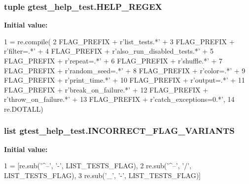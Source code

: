 \subsubsection[{H\+E\+L\+P\+\_\+\+R\+E\+G\+E\+X}]{\setlength{\rightskip}{0pt plus 5cm}tuple gtest\+\_\+help\+\_\+test.\+H\+E\+L\+P\+\_\+\+R\+E\+G\+E\+X}\label{namespacegtest__help__test_a0cc445bb25250e09cfa21c64a00e209e}
{\bfseries Initial value\+:}
\begin{DoxyCode}
1 = re.compile(
2     FLAG\_PREFIX + \textcolor{stringliteral}{r'list\_tests.*'} +
3     FLAG\_PREFIX + \textcolor{stringliteral}{r'filter=.*'} +
4     FLAG\_PREFIX + \textcolor{stringliteral}{r'also\_run\_disabled\_tests.*'} +
5     FLAG\_PREFIX + \textcolor{stringliteral}{r'repeat=.*'} +
6     FLAG\_PREFIX + \textcolor{stringliteral}{r'shuffle.*'} +
7     FLAG\_PREFIX + \textcolor{stringliteral}{r'random\_seed=.*'} +
8     FLAG\_PREFIX + \textcolor{stringliteral}{r'color=.*'} +
9     FLAG\_PREFIX + \textcolor{stringliteral}{r'print\_time.*'} +
10     FLAG\_PREFIX + \textcolor{stringliteral}{r'output=.*'} +
11     FLAG\_PREFIX + \textcolor{stringliteral}{r'break\_on\_failure.*'} +
12     FLAG\_PREFIX + \textcolor{stringliteral}{r'throw\_on\_failure.*'} +
13     FLAG\_PREFIX + \textcolor{stringliteral}{r'catch\_exceptions=0.*'},
14     re.DOTALL)
\end{DoxyCode}
\hypertarget{namespacegtest__help__test_a6f677b9f975f09db7604a5ee9c4821a3}{}
\subsubsection[{I\+N\+C\+O\+R\+R\+E\+C\+T\+\_\+\+F\+L\+A\+G\+\_\+\+V\+A\+R\+I\+A\+N\+T\+S}]{\setlength{\rightskip}{0pt plus 5cm}list gtest\+\_\+help\+\_\+test.\+I\+N\+C\+O\+R\+R\+E\+C\+T\+\_\+\+F\+L\+A\+G\+\_\+\+V\+A\+R\+I\+A\+N\+T\+S}\label{namespacegtest__help__test_a6f677b9f975f09db7604a5ee9c4821a3}
{\bfseries Initial value\+:}
\begin{DoxyCode}
1 = [re.sub(\textcolor{stringliteral}{'^--'}, \textcolor{stringliteral}{'-'}, LIST\_TESTS\_FLAG),
2                            re.sub(\textcolor{stringliteral}{'^--'}, \textcolor{stringliteral}{'/'}, LIST\_TESTS\_FLAG),
3                            re.sub(\textcolor{stringliteral}{'\_'}, \textcolor{stringliteral}{'-'}, LIST\_TESTS\_FLAG)]
\end{DoxyCode}
\hypertarget{namespacegtest__help__test_aa7f487cde98f691eecc5f1f5e67c0a69}{}
